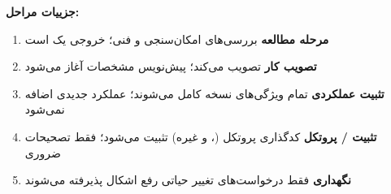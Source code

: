 


\CNchained{}


\textbf{جزییات مراحل:}

\begin{enumerate}
\def\labelenumi{\arabic{enumi}.}
\tightlist
\item
  \textbf{مرحله مطالعه}  بررسی‌های امکان‌سنجی و فنی؛ خروجی یک  است
\item
  \textbf{تصویب کار}   تصویب می‌کند؛ پیش‌نویس مشخصات آغاز می‌شود
\item
  \textbf{تثبیت عملکردی}  تمام ویژگی‌های نسخه کامل می‌شوند؛ عملکرد جدیدی اضافه نمی‌شود
\item
  \textbf{تثبیت  /\allowbreak{} پروتکل}  کدگذاری پروتکل (،  و غیره) تثبیت می‌شود؛ فقط تصحیحات ضروری
\item
  \textbf{نگهداری}  فقط درخواست‌های تغییر  حیاتی رفع اشکال پذیرفته می‌شوند
\end{enumerate}



